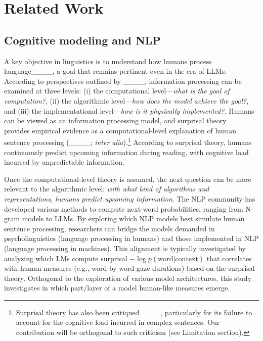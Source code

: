 \section{Related Work}
\label{sec:background}

\subsection{Cognitive modeling and NLP}
\label{subsec:cog_model}


A key objective in linguistics is to understand how humans process language____, a goal that remains pertinent even in the era of LLMs. According to perspectives outlined by ____, information processing can be examined at three levels:
(i) the computational level—\textit{what is the goal of computation?}, 
(ii) the algorithmic level—\textit{how does the model achieve the goal?}, and 
(iii) the implementational level—\textit{how is it physically implemented?}. 
Humans can be viewed as an information processing model, and surprisal theory____ provides empirical evidence as a computational-level explanation of human sentence processing (____; \textit{inter alia}).\footnote{Surprisal theory has also been critiqued____, particularly for its failure to account for the cognitive load incurred in complex sentences. Our contribution will be orthogonal to such criticism (see Limitation section).} 
According to surprisal theory, humans continuously predict upcoming information during reading, with cognitive load incurred by unpredictable information.

Once the computational-level theory is assumed, the next question can be more relevant to the algorithmic level: 
\textit{with what kind of algorithms and representations, humans predict upcoming information}. 
The NLP community has developed various methods to compute next-word probabilities, ranging from N-gram models to LLMs. 
By exploring which NLP models best simulate human sentence processing, researchers can bridge the models demanded in psycholinguistics (language processing in humans) and those implemented in NLP (language processing in machines). 
This alignment is typically investigated by analyzing which LMs compute surprisal $-\log p(\mathrm{word}|\mathrm{context})$ that correlates with human measures (e.g., word-by-word gaze durations) based on the surprisal theory. 
Orthogonal to the exploration of various model architectures, this study investigates in which part/layer of a model human-like measures emerge. 

